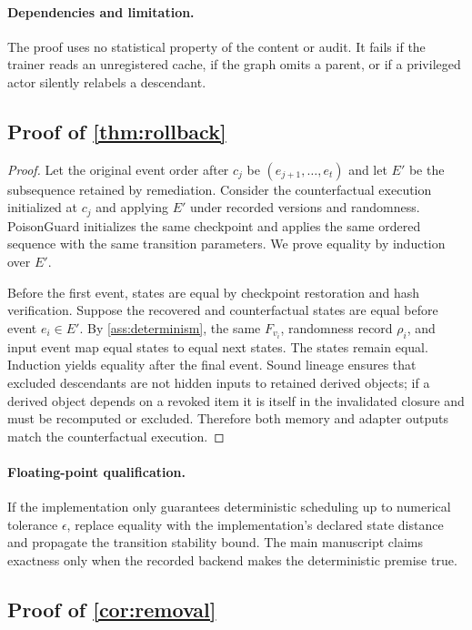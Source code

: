 \paragraph{Dependencies and limitation.} The proof uses no statistical property of the content or audit. It fails if the trainer reads an unregistered cache, if the graph omits a parent, or if a privileged actor silently relabels a descendant.

\subsection{Proof of \cref{thm:rollback}}

\begin{proof}
Let the original event order after $c_j$ be $(e_{j+1},\ldots,e_t)$ and let $E'$ be the subsequence retained by remediation. Consider the counterfactual execution initialized at $c_j$ and applying $E'$ under recorded versions and randomness. PoisonGuard initializes the same checkpoint and applies the same ordered sequence with the same transition parameters. We prove equality by induction over $E'$.

Before the first event, states are equal by checkpoint restoration and hash verification. Suppose the recovered and counterfactual states are equal before event $e_i\in E'$. By \cref{ass:determinism}, the same $F_{v_i}$, randomness record $\rho_i$, and input event map equal states to equal next states. The states remain equal. Induction yields equality after the final event. Sound lineage ensures that excluded descendants are not hidden inputs to retained derived objects; if a derived object depends on a revoked item it is itself in the invalidated closure and must be recomputed or excluded. Therefore both memory and adapter outputs match the counterfactual execution.
\end{proof}

\paragraph{Floating-point qualification.} If the implementation only guarantees deterministic scheduling up to numerical tolerance $\epsilon$, replace equality with the implementation's declared state distance and propagate the transition stability bound. The main manuscript claims exactness only when the recorded backend makes the deterministic premise true.

\subsection{Proof of \cref{cor:removal}}

